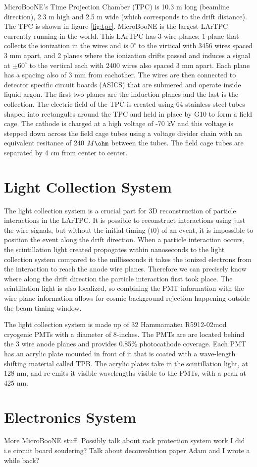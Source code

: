 MicroBooNE's Time Projection Chamber (TPC) is 10.3 m long (beamline direction), 2.3 m high and 2.5 m wide (which corresponds to the drift distance). The TPC is shown in figure \ref{fig:tpc}. MicroBooNE is the largest LArTPC currently running in the world\cite{microboone}. This LArTPC has 3 wire planes: 1 plane that collects the ionization in the wires and is $0^{\circ}$ to the virtical with 3456 wires spaced 3 mm apart, and 2 planes where the ionization drifts passed and induces a signal at $\pm 60^{\circ}$ to the vertical each with 2400 wires also spaced 3 mm apart. Each plane has a spacing also of 3 mm from eachother. The wires are then connected to detector specific circuit boards (ASICS) that are submered and operate inside liquid argon. The first two planes are the induction planes and the last is the collection. The electric field of the TPC is created using 64 stainless steel tubes shaped into rectangules around the TPC and held in place by G10 to form a field cage. The cathode is charged at a high voltage of -70 kV and this voltage is stepped down across the field cage tubes using a voltage divider chain with an equivalent resitance of 240 $M\ohm$ between the tubes. The field cage tubes are separated by 4 cm from center to center. 
\section{Light Collection System}
The light collection system is a crucial part for 3D reconstruction of particle interactions in the LArTPC. It is possible to reconstruct interactions using just the wire signals, but without the initial timing (t0) of an event, it is impossible to position the event along the drift direction. When a particle interaction occurs, the scintillation light created propogates within nanoseconds to the light collection system compared to the milliseconds it takes the ionized electrons from the interaction to reach the anode wire planes. Therefore we can precisely know where along the drift direction the particle interaction first took place. The scintillation light is also localized, so combining the PMT information with the wire plane information allows for cosmic background rejection happening outside the beam timing window.  

The light collection system is made up of 32 Hammamatsu R5912-02mod cryogenic PMTs with a diameter of 8-inches. The PMTs are are located behind the 3 wire anode planes and provides 0.85\% photocathode coverage. Each PMT has an acrylic plate mounted in front of it that is coated with a wave-length shifting material called TPB. The acrylic plates take in the scintillation light, at 128 nm, and re-emits it visible wavelengths visible to the PMTs, with a peak at 425 nm. 
\section{Electronics System} 
More MicroBooNE stuff. Possibly talk about rack protection system work I did i.e circuit board soudering? Talk about deconvolution paper Adam and I wrote a while back?
